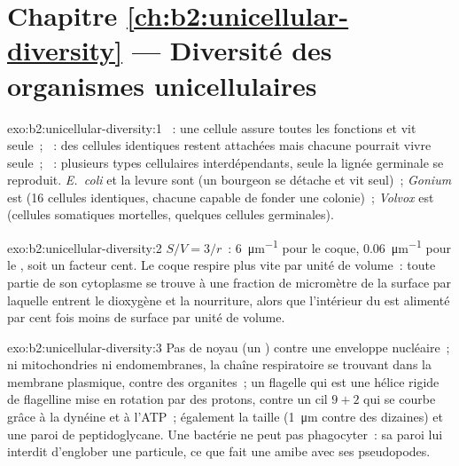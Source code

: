 \section*{Chapitre \ref{ch:b2:unicellular-diversity} --- Diversité des organismes unicellulaires}

\begin{solution}{exo:b2:unicellular-diversity:1}
~: une cellule assure toutes les fonctions et vit seule~;
~: des cellules identiques restent attachées mais chacune
pourrait vivre seule~; ~: plusieurs types cellulaires
interdépendants, seule la lignée germinale se reproduit. \emph{E.~coli}
et la levure sont  (un bourgeon se détache et vit seul)~;
\emph{Gonium} est  (16 cellules identiques, chacune capable de
fonder une colonie)~; \emph{Volvox} est  (cellules
somatiques mortelles, quelques cellules germinales).
\end{solution}

\begin{solution}{exo:b2:unicellular-diversity:2}
$S/V = 3/r$~: \qty{6}{\micro m^{-1}} pour le coque,
\qty{0.06}{\micro m^{-1}} pour le , soit un facteur cent.
Le coque respire plus vite par unité de volume~: toute partie de son
cytoplasme se trouve à une fraction de micromètre de la surface par
laquelle entrent le dioxygène et la nourriture, alors que l'intérieur
du  est alimenté par cent fois moins de surface par unité de
volume.
\end{solution}

\begin{solution}{exo:b2:unicellular-diversity:3}
Pas de noyau (un ) contre une enveloppe nucléaire~; ni
mitochondries ni endomembranes, la chaîne respiratoire se trouvant dans
la membrane plasmique, contre des organites~; un flagelle qui est une
hélice rigide de flagelline mise en rotation par des protons, contre un
cil $9+2$ qui se courbe grâce à la dynéine et à l'ATP~; également la
taille (\qty{1}{\micro m} contre des dizaines) et une paroi de
peptidoglycane. Une bactérie ne peut pas phagocyter~: sa paroi lui
interdit d'englober une particule, ce que fait une amibe avec ses
pseudopodes.
\end{solution}

